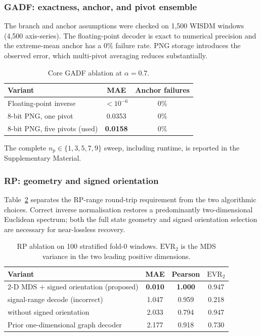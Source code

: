 \documentclass[10pt,a4paper,parskip=half-]{scrartcl}
\begin{document}
\subsubsection{GADF: exactness, anchor, and pivot ensemble}
\label{sec:gadf_ablation}


The branch and anchor assumptions were checked on 1,500 WISDM windows (4,500 axis-series). The floating-point decoder is exact to numerical precision and the extreme-mean anchor has a 0\% failure rate. PNG storage introduces the observed error, which multi-pivot averaging reduces substantially.

\begin{table}[!htbp]
\centering
\caption{Core GADF ablation at \(\alpha=0.7\).}
\label{tab:gadf_npivots}
\begin{tabular}{lcc}
\toprule
Variant & MAE & Anchor failures \\
\midrule
Floating-point inverse & \(<10^{-6}\) & 0\% \\
8-bit PNG, one pivot & 0.0353 & 0\% \\
8-bit PNG, five pivots (used) & \textbf{0.0158} & 0\% \\
\bottomrule
\end{tabular}
\end{table}

The complete \(n_p\in\{1,3,5,7,9\}\) sweep, including runtime, is reported in the Supplementary Material.

\subsubsection{RP: geometry and signed orientation}
\label{sec:rp_ablation}

Table~\ref{tab:rp_ablation} separates the RP-range round-trip requirement from the two algorithmic choices. Correct inverse normalisation restores a predominantly two-dimensional Euclidean spectrum; both the full state geometry and signed orientation selection are necessary for near-lossless recovery.

\begin{table}[!htbp]
\centering
\caption{RP ablation on 100 stratified fold-0 windows. \(\mathrm{EVR}_2\) is the MDS variance in the two leading positive dimensions.}
\label{tab:rp_ablation}
\small
\begin{tabular}{lccc}
\toprule
Variant & MAE & Pearson & \(\mathrm{EVR}_2\) \\
\midrule
2-D MDS + signed orientation (proposed) & \textbf{0.010} & \textbf{1.000} & 0.947 \\
\quad signal-range decode (incorrect) & 1.047 & 0.959 & 0.218 \\
\quad without signed orientation & 2.033 & 0.794 & 0.947 \\
Prior one-dimensional graph decoder & 2.177 & 0.918 & 0.730 \\
\bottomrule

\end{tabular}
\end{table}
\end{document}
